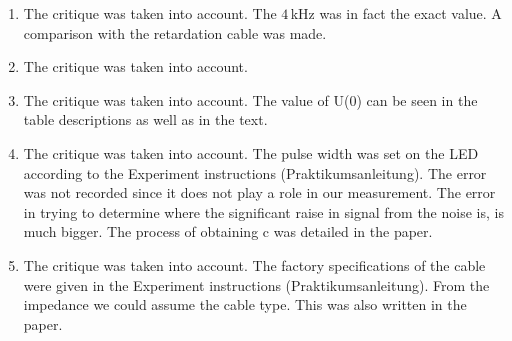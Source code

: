 \documentclass[a4paper,10pt]{article}
\begin{document}
\begin{enumerate}
    \item The critique was taken into account. 
    The $4\,$kHz was in fact the exact value.
    A comparison with the retardation cable was made.

    \item The critique was taken into account.

    \item The critique was taken into account. 
    The value of U(0) can be seen in the table descriptions as well as in the text.

    \item The critique was taken into account.
    The pulse width was set on the LED according to the Experiment instructions (Praktikumsanleitung).
    The error was not recorded since it does not play a role in our measurement.
    The error in trying to determine where the significant raise in signal from the noise is, is much bigger.
    The process of obtaining c was detailed in the paper.

    \item The critique was taken into account.
    The factory specifications of the cable were given in the Experiment instructions (Praktikumsanleitung).
    From the impedance we could assume the cable type.
    This was also written in the paper.
    

\end{enumerate}
    
\end{document}
